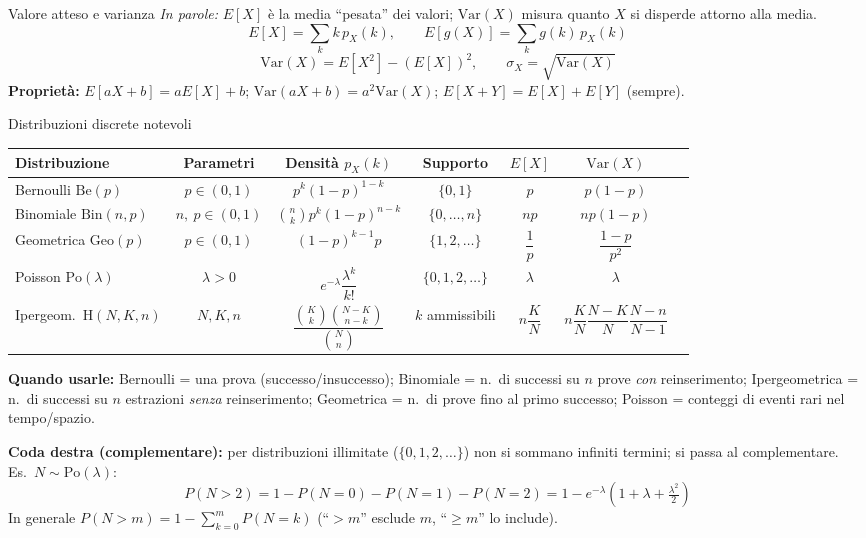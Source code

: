 \documentclass[11pt]{article}
\newcommand{\inparole}[1]{\emph{In parole:} #1}
\begin{document}
\begin{concetto}[barBlue]{Valore atteso e varianza}
\inparole{$E[X]$ \`e la media ``pesata'' dei valori; $\mathrm{Var}(X)$ misura quanto $X$ si disperde attorno alla media.}
\[ E[X] = \sum_{k} k\, p_X(k), \qquad E[g(X)] = \sum_{k} g(k)\, p_X(k) \]
\[ \mathrm{Var}(X) = E[X^2] - (E[X])^2, \qquad \sigma_X = \sqrt{\mathrm{Var}(X)} \]
\textbf{Propriet\`a:} $E[aX+b]=aE[X]+b$; \; $\mathrm{Var}(aX+b)=a^2\mathrm{Var}(X)$; \; $E[X+Y]=E[X]+E[Y]$ (sempre).
\end{concetto}

\begin{concetto}[barBlue]{Distribuzioni discrete notevoli}
\begin{center}\small
\begin{tabular}{lcccccc}
\hline
Distribuzione & Parametri & Densit\`a $p_X(k)$ & Supporto & $E[X]$ & $\mathrm{Var}(X)$ \\
\hline
Bernoulli $\mathrm{Be}(p)$ & $p \in (0,1)$ & $p^k(1-p)^{1-k}$ & $\{0,1\}$ & $p$ & $p(1-p)$ \\[6pt]
Binomiale $\mathrm{Bin}(n,p)$ & $n,\ p \in (0,1)$ & $\binom{n}{k}p^k(1-p)^{n-k}$ & $\{0,\dots,n\}$ & $np$ & $np(1-p)$ \\[6pt]
Geometrica $\mathrm{Geo}(p)$ & $p \in (0,1)$ & $(1-p)^{k-1}p$ & $\{1,2,\dots\}$ & $\dfrac{1}{p}$ & $\dfrac{1-p}{p^2}$ \\[10pt]
Poisson $\mathrm{Po}(\lambda)$ & $\lambda>0$ & $e^{-\lambda}\dfrac{\lambda^k}{k!}$ & $\{0,1,2,\dots\}$ & $\lambda$ & $\lambda$ \\[10pt]
Ipergeom.\ $\mathrm{H}(N,K,n)$ & $N,K,n$ & $\dfrac{\binom{K}{k}\binom{N-K}{n-k}}{\binom{N}{n}}$ & $k$ ammissibili & $n\dfrac{K}{N}$ & $n\dfrac{K}{N}\dfrac{N-K}{N}\dfrac{N-n}{N-1}$ \\[6pt]
\hline
\end{tabular}
\end{center}
\small \textbf{Quando usarle:} Bernoulli = una prova (successo/insuccesso); Binomiale = n.\ di successi su $n$ prove \emph{con} reinserimento; Ipergeometrica = n.\ di successi su $n$ estrazioni \emph{senza} reinserimento; Geometrica = n.\ di prove fino al primo successo; Poisson = conteggi di eventi rari nel tempo/spazio.

\textbf{Coda destra (complementare):} per distribuzioni illimitate ($\{0,1,2,\dots\}$) non si sommano infiniti termini; si passa al complementare. Es.\ $N\sim\mathrm{Po}(\lambda)$:
\[ P(N > 2) = 1 - P(N{=}0) - P(N{=}1) - P(N{=}2) = 1 - e^{-\lambda}\!\left(1+\lambda+\tfrac{\lambda^2}{2}\right) \]
In generale $P(N>m)=1-\sum_{k=0}^{m}P(N{=}k)$ \; (``$>m$'' esclude $m$, ``$\ge m$'' lo include).
\end{concetto}
\end{document}
